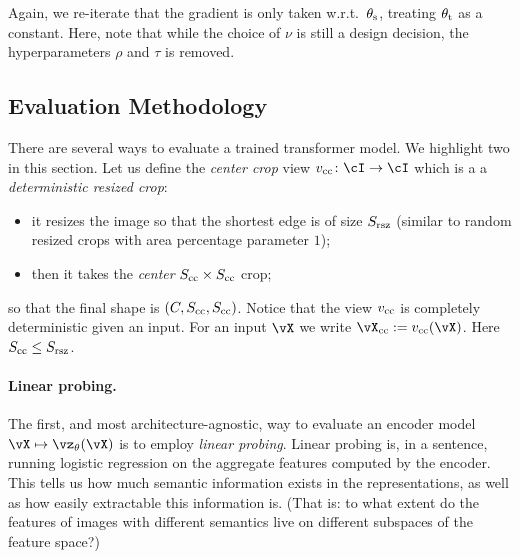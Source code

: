 \documentclass[../../book-main.tex]{subfiles}
\begin{document}
Again, we re-iterate that the gradient is only taken w.r.t.~\(\theta_{\mathrm{s}}\), treating \(\theta_{\mathrm{t}}\) as a constant. Here, note that while the choice of \(\nu\) is still a design decision, the hyperparameters \(\rho\) and \(\tau\) is removed.


\subsection{Evaluation Methodology}\label{sub:contrastive_learning_evals}
There are several ways to evaluate a trained transformer model. We highlight two in this section. Let us define the \textit{center crop} view \(v_{\cc} \colon \cI \to \cI\) which is a a \textit{deterministic resized crop}:
\begin{itemize}
    \item it resizes the image so that the shortest edge is of size \(S_{\mathrm{rsz}}\) (similar to random resized crops with area percentage parameter \(1\));
    \item then it takes the \textit{center} \(S_{\mathrm{cc}} \times S_{\mathrm{cc}}\) crop;
\end{itemize}
so that the final shape is \((C, S_{\mathrm{cc}}, S_{\mathrm{cc}})\). Notice that the view \(v_{\mathrm{cc}}\) is completely deterministic given an input. For an input \(\vX\) we write \(\vX_{\cc} := v_{\cc}(\vX)\). Here \(S_{\mathrm{cc}} \leq S_{\mathrm{rsz}}\).


\paragraph{Linear probing.}

The first, and most architecture-agnostic, way to evaluate an encoder model \(\vX \mapsto \vz_{\theta}(\vX)\) is to employ \textit{linear probing}. Linear probing is, in a sentence, running logistic regression on the aggregate features computed by the encoder. This tells us how much semantic information exists in the representations, as well as how easily extractable this information is. (That is: to what extent do the features of images with different semantics live on different subspaces of the feature space?)
\end{document}
